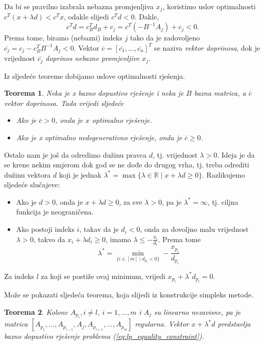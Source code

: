 \documentclass[b5paper, utf8, 11pt, colorlinks]{book}
\newtheorem{thm}{Teorema}[chapter]
\theoremstyle{definition}
\begin{document}
Da bi se pravilno izabrala nebazna promjenljiva $x_j$, koristimo  uslov optimalnosti $c^T ( x + \lambda d ) < c^T x $, odakle slijedi $c^T d < 0$.  Dakle, $$c^T d = c_B^T d_B + c_j = c^T ( - B^{-1} A_j ) + c_j < 0.$$
Prema tome, biramo (nebazni) indeks $j$ tako da je zadovoljeno $ \overline{c_j} = c_j - c_B^T B^{-1}A_j < 0$. Vektor $\overline{c}=[\overline{c_1}, \ldots, \overline{c_n}]^T$ se naziva \emph{vektor doprinosa}, dok je vrijednost $\overline{c_j}$ \emph{doprinos nebazne promjenljive} $x_j$. 

Iz sljedeće teoreme dobijamo uslove optimalnosti rješenja.

\begin{thm}
	Neka je x bazno dopustivo rješenje i neka je $B$ bazna matrica, a $\overline{c}$ vektor doprinosa. Tada vrijedi sljedeće
	\begin{itemize}
		\item Ako je $\overline{c} >0$, onda je $x$ optimalno rješenje.
		\item Ako je x optimalno nedegenerativno rješenje, onda je $\overline{c} \geq 0$.
	\end{itemize}
\end{thm}

Ostalo nam je još da odredimo dužinu   pravca $d$, tj. vrijednost $\lambda>0$. Ideja je da se krene nekim smjerom dok god se ne dođe do drugog vrha, tj. treba odrediti dužinu vektora $d$ koji je jednak $\lambda^* = \max \{ \lambda \in \mathbb{R} \mid x + \lambda d \geq 0 \}$. Razlikujemo sljedeće slučajeve:
\begin{itemize}
	\item Ako je $d >0$, onda je $  x + \lambda d \geq 0$, za sve $\lambda > 0$, pa je $\lambda^* = \infty$, tj. ciljna funkcija je neograničena.
	\item Ako postoji indeks $i$, takav da je $d_i < 0$, onda za dovoljno malu vrijednost $\lambda>0$, takvo da $x_i + \lambda d_i \geq 0$, imamo $\lambda \leq -\frac{x_i}{d_i}$. Prema tome 
	$$ \lambda^* = \min_{ \{i\in [m] \mid d_{p_i} < 0  \}} - \frac{x_{p_i}}{d_{p_i}} $$
\end{itemize}
Za indeks $l$ za koji se postiže ovaj minimum, vrijedi $x_{p_l} + \lambda^* d_{p_l}=0$.

Može se pokazati sljedeća teorema, koja slijedi iz konstrukcije simpleks metode.

 
 \begin{thm}
 	Kolone $A_{p_i}, i\not = l$, $i=1,\ldots,m$ i $A_{j}$ su linearno nezavisne, pa je matrica 
 	$[A_{p_1},\ldots, A_{p_{l-1}}, A_j, A_{p_{l+1}}, \ldots, A_{p_m}]$
 	regularna. Vektor $x + \lambda^* d$ predstavlja bazno dopustivo rješenje problema (\ref{eq:lp_equality_constraint}). 
 \end{thm}
\end{document}
